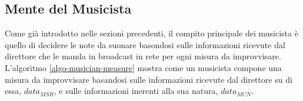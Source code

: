 \subsection{Mente del Musicista}
%   	
%
%
%   	
%

Come già introdotto nelle sezioni precedenti, il compito principale dei musicista è
quello di decidere le note da suonare basondosi sulle informazioni
ricevute dal direttore che le manda in broadcast in rete per ogni misura
da improvvisare. L'algoritmo \ref{algo-musician-measure} mostra come un
musicista compone una misura da improvvisare basandosi sulle
informazioni ricevute dal direttore su di essa, $data_{MSR}$, e sulle
informazioni inerenti alla sua natura, $data_{MCN}$.  

